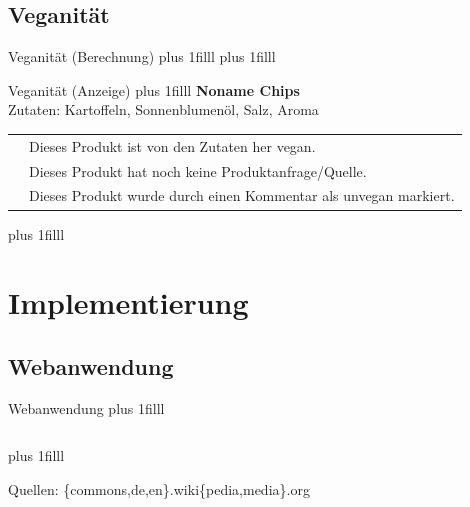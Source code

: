 \documentclass{beamer}
\begin{document}
\subsection*{Veganität}
\begin{frame}{Veganität (Berechnung)}
	\vskip0pt plus 1filll
	\centering
	\vskip0pt plus 1filll
\end{frame}

\begin{frame}{Veganität (Anzeige)}
	\vskip0pt plus 1filll
	\textbf{Noname Chips}\\
	Zutaten: Kartoffeln, Sonnenblumenöl, Salz, Aroma\\
	\begin{tabular}[b]{ c b{} }
		& Dieses Produkt ist von den Zutaten her vegan.\\
		& Dieses Produkt hat noch keine Produktanfrage/Quelle.\\
		& Dieses Produkt wurde durch einen Kommentar als unvegan
		markiert.
	\end{tabular}
	\vskip0pt plus 1filll
\end{frame}

\section{Implementierung}
\subsection*{Webanwendung}
\begin{frame}{Webanwendung}
	\vskip0pt plus 1filll
		\begin{columns}
				\centering
				\centering
				\centering
		\end{columns}
	\vskip0pt plus 1filll
	\par\hrulefill\par
	\tiny{Quellen: \{commons,de,en\}.wiki\{pedia,media\}.org}
\end{frame}
\end{document}
